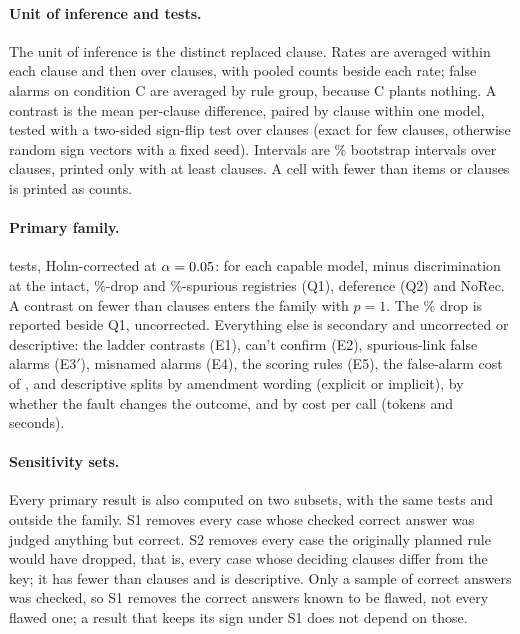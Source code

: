 \paragraph{Unit of inference and tests.}
The unit of inference is the distinct replaced clause. Rates are averaged within each clause and then over clauses, with
pooled counts beside each rate; false alarms on condition C are averaged by rule group, because C plants nothing. A
contrast is the mean per-clause difference, paired by clause within one model, tested with a two-sided sign-flip test over
clauses (exact for few clauses, otherwise \NPermutations{} random sign vectors with a fixed seed). Intervals are
\CILevel\% bootstrap intervals over clauses, printed only with at least \MinClauses{} clauses. A cell with fewer than
\SparseItems{} items or \SparseClauses{} clauses is printed as counts.

\paragraph{Primary family.}
\NPrimaryTestsVFive{} tests, Holm-corrected at $\alpha=0.05$: for each capable model,  minus 
discrimination at the intact, \DamageDropFifty\%-drop and \DamageSpuriousTen\%-spurious registries (Q1), deference (Q2) and
NoRec. A contrast on fewer than \MinClauses{} clauses enters the family with $p=1$. The \DamageDropTwentyFive\% drop is
reported beside Q1, uncorrected. Everything else is secondary and uncorrected or descriptive: the ladder contrasts (E1),
can't confirm (E2), spurious-link false alarms (E3$'$), misnamed alarms (E4), the scoring rules (E5), the false-alarm cost
of , and descriptive splits by amendment wording (explicit or implicit), by whether the fault changes the
outcome, and by cost per call (tokens and seconds).

\paragraph{Sensitivity sets.}
Every primary result is also computed on two subsets, with the same tests and outside the family. S1 removes
every case whose checked correct answer was judged anything but correct. S2 removes every case the originally
planned rule would have dropped, that is, every case whose deciding clauses differ from the key; it has fewer than
\MinClauses{} clauses and is descriptive. Only a sample of correct answers was checked, so S1 removes the correct
answers known to be flawed, not every flawed one; a result that keeps its sign under S1 does not depend on those.

